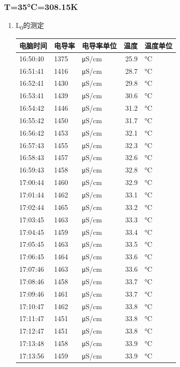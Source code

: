 \documentclass[11pt]{article}
\begin{document}
\subsubsection{T=35°C=308.15K}
\label{sec:orge89a038}
\begin{enumerate}
\item L\textsubscript{0}的测定
\label{sec:org101eb75}
\begin{center}
\begin{tabular}{l|lp{3cm}r|l}
电脑时间 & 电导率 & 电导率单位 & 温度 & 温度单位\\
\hline
16:50:40 & 1375 & μS/cm & 25.9 & °C\\
16:51:41 & 1416 & μS/cm & 28.7 & °C\\
16:52:41 & 1430 & μS/cm & 29.8 & °C\\
16:53:41 & 1439 & μS/cm & 30.6 & °C\\
16:54:42 & 1446 & μS/cm & 31.2 & °C\\
16:55:42 & 1450 & μS/cm & 31.7 & °C\\
16:56:42 & 1453 & μS/cm & 32.1 & °C\\
16:57:43 & 1455 & μS/cm & 32.3 & °C\\
16:58:43 & 1457 & μS/cm & 32.6 & °C\\
16:59:43 & 1458 & μS/cm & 32.8 & °C\\
17:00:44 & 1460 & μS/cm & 32.9 & °C\\
17:01:44 & 1462 & μS/cm & 33.1 & °C\\
17:02:44 & 1465 & μS/cm & 33.2 & °C\\
17:03:45 & 1463 & μS/cm & 33.3 & °C\\
17:04:45 & 1459 & μS/cm & 33.4 & °C\\
17:05:45 & 1463 & μS/cm & 33.5 & °C\\
17:06:45 & 1464 & μS/cm & 33.6 & °C\\
17:07:46 & 1463 & μS/cm & 33.6 & °C\\
17:08:46 & 1458 & μS/cm & 33.7 & °C\\
17:09:46 & 1461 & μS/cm & 33.7 & °C\\
17:10:47 & 1462 & μS/cm & 33.8 & °C\\
17:11:47 & 1451 & μS/cm & 33.8 & °C\\
17:12:47 & 1451 & μS/cm & 33.8 & °C\\
17:13:48 & 1458 & μS/cm & 33.9 & °C\\
17:13:56 & 1459 & μS/cm & 33.9 & °C\\
\end{tabular}
\end{center}

\end{enumerate}
\end{document}
